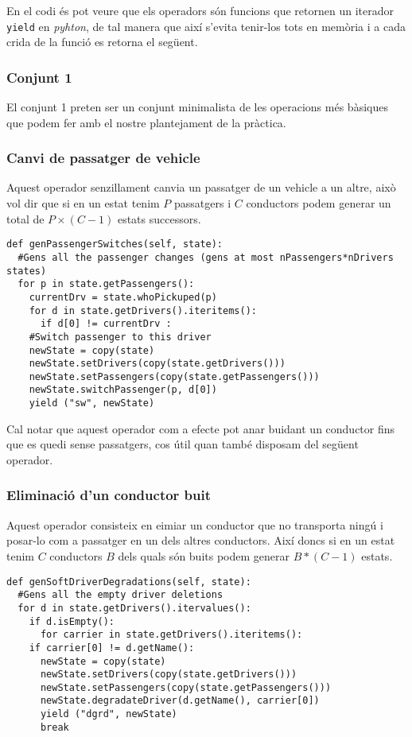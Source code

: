 En el codi és pot veure que els operadors són funcions que retornen un iterador \texttt{yield} en \emph{pyhton},
de tal manera que així s'evita tenir-los tots en memòria i a cada crida de la funció es retorna el següent.

\subsubsection{Conjunt 1}
El conjunt 1 preten ser un conjunt minimalista de les operacions més bàsiques que podem fer amb el nostre plantejament
de la pràctica.
\subsubsection{Canvi de passatger de vehicle}
Aquest operador senzillament canvia un passatger de un vehicle a un altre, això vol dir que si en un estat
tenim $P$ passatgers i $C$ conductors podem generar un total de $P\times(C-1)$ estats successors.

\begin{verbatim}
def genPassengerSwitches(self, state):
  #Gens all the passenger changes (gens at most nPassengers*nDrivers states)
  for p in state.getPassengers():
    currentDrv = state.whoPickuped(p)  
    for d in state.getDrivers().iteritems():
      if d[0] != currentDrv :
	#Switch passenger to this driver
	newState = copy(state)
	newState.setDrivers(copy(state.getDrivers()))
	newState.setPassengers(copy(state.getPassengers()))
	newState.switchPassenger(p, d[0])
	yield ("sw", newState)
\end{verbatim}

Cal notar que aquest operador com a efecte pot anar buidant un conductor fins que es quedi sense passatgers,
cos útil quan també disposam del següent operador.

\subsubsection{Eliminació d'un conductor buit}
Aquest operador consisteix en e\lgem imiar un conductor que no transporta ningú i posar-lo com a passatger
en un dels altres conductors. Així doncs si en un estat tenim $C$ conductors $B$ dels quals són buits
podem generar $B*(C-1)$ estats.

\begin{verbatim}
def genSoftDriverDegradations(self, state):
  #Gens all the empty driver deletions
  for d in state.getDrivers().itervalues():
    if d.isEmpty():
      for carrier in state.getDrivers().iteritems():
	if carrier[0] != d.getName():
	  newState = copy(state)
	  newState.setDrivers(copy(state.getDrivers()))
	  newState.setPassengers(copy(state.getPassengers()))
	  newState.degradateDriver(d.getName(), carrier[0])
	  yield ("dgrd", newState)
	  break
\end{verbatim}

